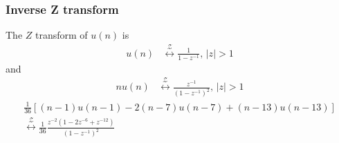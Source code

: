 \documentclass{beamer}
\providecommand{\sbrak}[1]{\ensuremath{{}\left[#1\right]}}
\providecommand{\brak}[1]{\ensuremath{\left(#1\right)}}
\theoremstyle{remark}
\providecommand{\abs}[1]{\left\vert#1\right\vert}
\providecommand{\system}[1]{\overset{\mathcal{#1}}{ \longleftrightarrow}}
\numberwithin{equation}{section}
\begin{document}
\begin{frame}
\frametitle{Inverse Z transform}
		The $Z$ transform of $u(n)$ is 
\begin{align}
u(n)&\system{Z} 
 \frac{1}{1-z^{-1}},\,\abs{z} > 1
\end{align}
and
\begin{align}
\label{eq:dice-ramp}
nu(n)&\system{Z} \frac{z^{-1}}{\brak{1-z^{-1}}^2},\,
\abs{z} > 1
\end{align}
\begin{multline}
\frac{1}{36}\sbrak{\brak{n-1}u(n-1) - 2 \brak{n-7}u(n-7)
	+\brak{n-13}u(n-13)}
	\\
\system{Z}
\frac{1}{36}\frac{z^{-2}\brak{1-2z^{-6}+z^{-12}}}{\brak{1-z^{-1}}^2}
\label{eq:dice_xz_closed}
\end{multline}
\end{frame}
\end{document}

